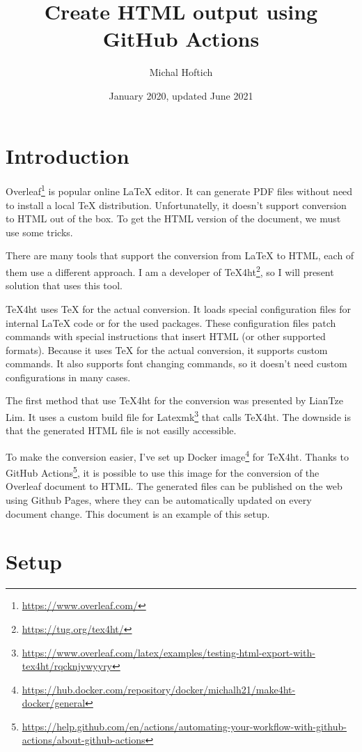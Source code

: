 \documentclass{article}
\title{Create HTML output using GitHub Actions}
\author{Michal Hoftich}
\date{January 2020, updated June 2021}
\newcommand\footurl[1]{\footnote{\url{#1}}}
\newcommand\urllink[2]{#1\footurl{#2}}
\begin{document}
\maketitle

\section{Introduction}

\urllink{Overleaf}{https://www.overleaf.com/} is popular online \LaTeX{}
editor. It can generate PDF files 
without need to install a local \TeX{} distribution. Unfortunatelly, it doesn't
support conversion to HTML out of the box. To get the HTML version of the
document, we must use some tricks.

There are many tools that support the conversion from \LaTeX{} to HTML, each of
them use a different approach. I am a developer of
\urllink{\TeX4ht}{https://tug.org/tex4ht/}, so I will present solution that
uses this tool. 

\TeX4ht uses \TeX{} for the actual conversion. It loads special configuration
files for internal \LaTeX{} code or for the used packages. These configuration
files patch commands with special instructions that insert HTML (or other
supported formats). Because it uses \TeX{} for the actual conversion, it
supports custom commands. It also supports font changing commands, so  it
doesn't need custom configurations in many cases.

The first method that use \TeX4ht for the conversion was presented by LianTze
Lim. It uses a custom build file for
\urllink{Latexmk}{https://www.overleaf.com/latex/examples/testing-html-export-with-tex4ht/rqcknjvwyyry} 
that calls \TeX4ht. The downside is that the generated HTML file is not easilly accessible.  

To make the conversion easier, I've set up \urllink{Docker image}{https://hub.docker.com/repository/docker/michalh21/make4ht-docker/general} for \TeX4ht. 
Thanks to \urllink{GitHub Actions}{https://help.github.com/en/actions/automating-your-workflow-with-github-actions/about-github-actions}, 
it is possible to use this image for the conversion of the Overleaf document to HTML. 
The generated files can be published on the web using Github Pages, where they can be automatically 
updated on every document change. This document is an example of this setup.

\section{Setup}
\end{document}
